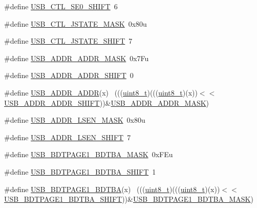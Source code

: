 \begin{DoxyCompactItemize}
\#define \hyperlink{group___u_s_b___register___masks_gaa3a02fa6ec226d10d54353456d44fa88}{U\+S\+B\+\_\+\+C\+T\+L\+\_\+\+S\+E0\+\_\+\+S\+H\+I\+FT}~6
\item 
\#define \hyperlink{group___u_s_b___register___masks_ga3a56395d81066c161d523479ed340907}{U\+S\+B\+\_\+\+C\+T\+L\+\_\+\+J\+S\+T\+A\+T\+E\+\_\+\+M\+A\+SK}~0x80u
\item 
\#define \hyperlink{group___u_s_b___register___masks_gad553773ca9a02b344ab10269c999d143}{U\+S\+B\+\_\+\+C\+T\+L\+\_\+\+J\+S\+T\+A\+T\+E\+\_\+\+S\+H\+I\+FT}~7
\item 
\#define \hyperlink{group___u_s_b___register___masks_ga7ccfd8bde2bb3831d13280315df4501c}{U\+S\+B\+\_\+\+A\+D\+D\+R\+\_\+\+A\+D\+D\+R\+\_\+\+M\+A\+SK}~0x7\+Fu
\item 
\#define \hyperlink{group___u_s_b___register___masks_ga57c7c394504da946dae75d5b20a2f297}{U\+S\+B\+\_\+\+A\+D\+D\+R\+\_\+\+A\+D\+D\+R\+\_\+\+S\+H\+I\+FT}~0
\item 
\#define \hyperlink{group___u_s_b___register___masks_ga9516a2f10616a785a9dab6f55a8e1e34}{U\+S\+B\+\_\+\+A\+D\+D\+R\+\_\+\+A\+D\+DR}(x)                                              ~(((\hyperlink{_p_e___types_8h_aba7bc1797add20fe3efdf37ced1182c5}{uint8\+\_\+t})(((\hyperlink{_p_e___types_8h_aba7bc1797add20fe3efdf37ced1182c5}{uint8\+\_\+t})(x))$<$$<$\hyperlink{group___u_s_b___register___masks_ga57c7c394504da946dae75d5b20a2f297}{U\+S\+B\+\_\+\+A\+D\+D\+R\+\_\+\+A\+D\+D\+R\+\_\+\+S\+H\+I\+FT}))\&\hyperlink{group___u_s_b___register___masks_ga7ccfd8bde2bb3831d13280315df4501c}{U\+S\+B\+\_\+\+A\+D\+D\+R\+\_\+\+A\+D\+D\+R\+\_\+\+M\+A\+SK})
\item 
\#define \hyperlink{group___u_s_b___register___masks_ga695e1ebe159d45ecd94fe40627ac121e}{U\+S\+B\+\_\+\+A\+D\+D\+R\+\_\+\+L\+S\+E\+N\+\_\+\+M\+A\+SK}~0x80u
\item 
\#define \hyperlink{group___u_s_b___register___masks_ga7c81adb1ac1c658006ea0ebfd4644634}{U\+S\+B\+\_\+\+A\+D\+D\+R\+\_\+\+L\+S\+E\+N\+\_\+\+S\+H\+I\+FT}~7
\item 
\#define \hyperlink{group___u_s_b___register___masks_gacd2b27fefcff6f79e930e76d2a1a7b26}{U\+S\+B\+\_\+\+B\+D\+T\+P\+A\+G\+E1\+\_\+\+B\+D\+T\+B\+A\+\_\+\+M\+A\+SK}~0x\+F\+Eu
\item 
\#define \hyperlink{group___u_s_b___register___masks_ga50c84ff08884c9825cf6c513f11aabe4}{U\+S\+B\+\_\+\+B\+D\+T\+P\+A\+G\+E1\+\_\+\+B\+D\+T\+B\+A\+\_\+\+S\+H\+I\+FT}~1
\item 
\#define \hyperlink{group___u_s_b___register___masks_ga4c24d2700854ca26779e3343dc7058da}{U\+S\+B\+\_\+\+B\+D\+T\+P\+A\+G\+E1\+\_\+\+B\+D\+T\+BA}(x)                                    ~(((\hyperlink{_p_e___types_8h_aba7bc1797add20fe3efdf37ced1182c5}{uint8\+\_\+t})(((\hyperlink{_p_e___types_8h_aba7bc1797add20fe3efdf37ced1182c5}{uint8\+\_\+t})(x))$<$$<$\hyperlink{group___u_s_b___register___masks_ga50c84ff08884c9825cf6c513f11aabe4}{U\+S\+B\+\_\+\+B\+D\+T\+P\+A\+G\+E1\+\_\+\+B\+D\+T\+B\+A\+\_\+\+S\+H\+I\+FT}))\&\hyperlink{group___u_s_b___register___masks_gacd2b27fefcff6f79e930e76d2a1a7b26}{U\+S\+B\+\_\+\+B\+D\+T\+P\+A\+G\+E1\+\_\+\+B\+D\+T\+B\+A\+\_\+\+M\+A\+SK})

\end{DoxyCompactItemize}
